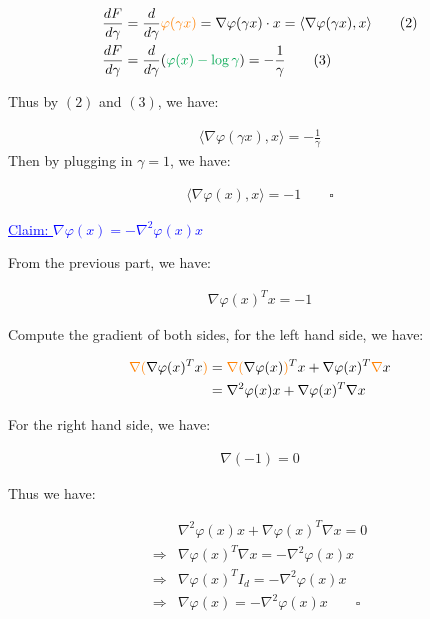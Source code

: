\documentclass{article}
\begin{document}
\begin{align*}
    \frac{dF}{d\gamma} &= \frac{d}{d\gamma} \textcolor{orange}{\varphi (\gamma x)} = \nabla \varphi (\gamma x) \cdot x = \langle \nabla \varphi (\gamma x), x \rangle \tag{2}\\
    \frac{dF}{d\gamma} &= \frac{d}{d\gamma} (\textcolor{Green}{\varphi (x) - \log \gamma}) = - \frac{1}{\gamma} \tag{3}
\end{align*}

Thus by $(2)$ and $(3)$, we have:

\begin{align*}
    \langle \nabla \varphi (\gamma x), x \rangle = - \frac{1}{\gamma}
\end{align*}
Then by plugging in $\gamma = 1$, we have:

\begin{align*}
    \langle \nabla \varphi (x), x \rangle = - 1 \qquad \square
\end{align*}

\textcolor{blue}{\underline{Claim: $\nabla \varphi (x) = - \nabla^2 \varphi ( x ) x$ } }
\bigskip

From the previous part, we have:

\begin{align*}
    \nabla \varphi (x)^T x = - 1
\end{align*}

Compute the gradient of both sides, for the left hand side, we have:

\begin{align*}
    \textcolor{orange}{\nabla(}\nabla \varphi (x)^T x\textcolor{orange}{)}
    &= \textcolor{orange}{\nabla (}\nabla \varphi (x)\textcolor{orange}{)}^T x + \nabla \varphi (x)^T \textcolor{orange}{\nabla} x  \\
    &= \nabla^2 \varphi (x) x + \nabla \varphi (x)^T \nabla x  \\
\end{align*}

For the right hand side, we have:

\begin{align*}
    \nabla (- 1) = 0
\end{align*}

Thus we have:

\begin{align*}
    &\nabla^2 \varphi (x) x + \nabla \varphi (x)^T \nabla x = 0 \\
    \Rightarrow &\nabla \varphi (x)^T \nabla x = - \nabla^2 \varphi (x) x \\
    \Rightarrow &\nabla \varphi (x)^T I_d = - \nabla^2 \varphi (x) x \\
    \Rightarrow &\nabla \varphi (x) = - \nabla^2 \varphi (x) x \qquad \square
\end{align*}
\end{document}
